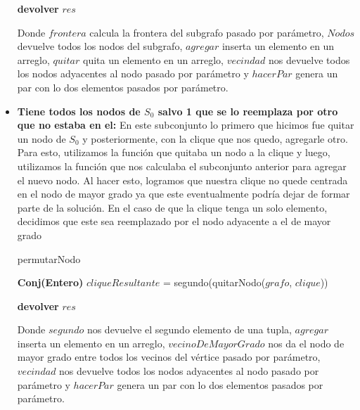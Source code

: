 \begin{itemize}
\begin{algorithm}[H]
    \textbf{devolver} $res$ \\
\end{algorithm}
Donde $frontera$ calcula la frontera del subgrafo pasado por parámetro, $Nodos$ devuelve todos los nodos del subgrafo, $agregar$ inserta un elemento en un arreglo, $quitar$ quita un elemento en un arreglo, $vecindad$ nos devuelve todos los nodos adyacentes al nodo pasado por parámetro y $hacerPar$ genera un par con lo dos elementos pasados por parámetro. \newline

\item \textbf{Tiene todos los nodos de $S_{0}$ salvo 1 que se lo reemplaza por otro que no estaba en el:} \newline
En este subconjunto lo primero que hicimos fue quitar un nodo de $S_{0}$ y posteriormente, con la clique que nos quedo, agregarle otro. Para esto, utilizamos la función que quitaba un nodo a la clique y luego, utilizamos la función que nos calculaba el subconjunto anterior para agregar el nuevo nodo. Al hacer esto, logramos que nuestra clique no quede centrada en el nodo de mayor grado ya que este eventualmente podría dejar de formar parte de la solución.
En el caso de que la clique tenga un solo elemento, decidimos que este sea reemplazado por el nodo adyacente a el de mayor grado \newline
\begin{algorithm}[H]
    \SetAlgoLined
    \caption{permutarNodo}
	
   \textbf{Conj(Entero)} $cliqueResultante$ = segundo(quitarNodo($grafo$, $clique$)) \\


    \textbf{devolver} $res$ \\
\end{algorithm}
Donde $segundo$ nos devuelve el segundo elemento de una tupla,  $agregar$ inserta un elemento en un arreglo, $vecinoDeMayorGrado$ nos da el nodo de mayor grado entre todos los vecinos del vértice pasado por parámetro, $vecindad$ nos devuelve todos los nodos adyacentes al nodo pasado por parámetro y $hacerPar$ genera un par con lo dos elementos pasados por parámetro. \newline
\end{itemize}

